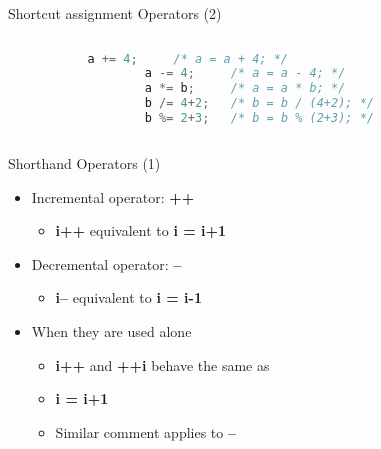 \begin{frame}[fragile]{Shortcut assignment Operators (2)}
\begin{columns}
\begin{column}{0.17\linewidth}
\end{column}
\begin{column}{0.65\linewidth}
	\begin{lstlisting}[numbers=none, language=c, rulecolor=\color{blue}]
		a += 4;		/* a = a + 4; */
		a -= 4;		/* a = a - 4; */
		a *= b;		/* a = a * b; */
		b /= 4+2;	/* b = b / (4+2); */
		b %= 2+3;	/* b = b % (2+3); */
	\end{lstlisting}
\end{column}
\begin{column}{0.17\linewidth}
\end{column}
\end{columns}
\end{frame}

\begin{frame}[fragile]{Shorthand Operators (1)}
\begin{itemize}
	\item {Incremental operator: \textbf{++}}
	\begin{itemize}
		\item {\textbf{i++} equivalent to \textbf{i = i+1}}
	\end{itemize}
	\item {Decremental operator: \textbf{--}}
	\begin{itemize}
		\item {\textbf{i--} equivalent to \textbf{i = i-1}}
	\end{itemize}
	\item {When they are used alone}
	\begin{itemize}
		\item {\textbf{i++} and \textbf{++i} behave the same as}
		\item {\textbf{i = i+1}}
		\item {Similar comment applies to \textbf{--}}
	\end{itemize}
\end{itemize}
\end{frame}

